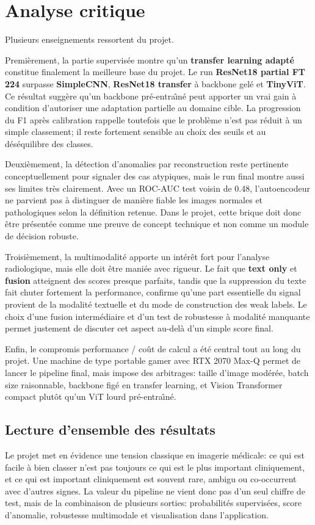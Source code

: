 \documentclass[11pt,a4paper]{article}
\newif\ifsectionbreakenabled
\let\oldsection\section
\renewcommand{\section}[1]{%
    \ifsectionbreakenabled
        \clearpage
    \else
        \sectionbreakenabledtrue
    \fi
    \oldsection{#1}%
}
\begin{document}
\section{Analyse critique}
Plusieurs enseignements ressortent du projet.

Premi\`erement, la partie supervis\'ee montre qu'un \textbf{transfer learning adapt\'e} constitue finalement la meilleure base du projet. Le run \textbf{ResNet18 partial FT 224} surpasse \textbf{SimpleCNN}, \textbf{ResNet18 transfer} \`a backbone gel\'e et \textbf{TinyViT}. Ce r\'esultat sugg\`ere qu'un backbone pr\'e-entra\^\i n\'e peut apporter un vrai gain \`a condition d'autoriser une adaptation partielle au domaine cible. La progression du F1 apr\`es calibration rappelle toutefois que le probl\`eme n'est pas r\'eduit \`a un simple classement; il reste fortement sensible au choix des seuils et au d\'es\'equilibre des classes.

Deuxi\`emement, la d\'etection d'anomalies par reconstruction reste pertinente conceptuellement pour signaler des cas atypiques, mais le run final montre aussi ses limites tr\`es clairement. Avec un ROC-AUC test voisin de 0.48, l'autoencodeur ne parvient pas \`a distinguer de mani\`ere fiable les images normales et pathologiques selon la d\'efinition retenue. Dans le projet, cette brique doit donc \^etre pr\'esent\'ee comme une preuve de concept technique et non comme un module de d\'ecision robuste.

Troisi\`emement, la multimodalit\'e apporte un int\'er\^et fort pour l'analyse radiologique, mais elle doit \^etre mani\'ee avec rigueur. Le fait que \textbf{text only} et \textbf{fusion} atteignent des scores presque parfaits, tandis que la suppression du texte fait chuter fortement la performance, confirme qu'une part essentielle du signal provient de la modalit\'e textuelle et du mode de construction des weak labels. Le choix d'une fusion interm\'ediaire et d'un test de robustesse \`a modalit\'e manquante permet justement de discuter cet aspect au-del\`a d'un simple score final.

Enfin, le compromis performance / co\^ut de calcul a \'et\'e central tout au long du projet. Une machine de type portable gamer avec RTX 2070 Max-Q permet de lancer le pipeline final, mais impose des arbitrages: taille d'image mod\'er\'ee, batch size raisonnable, backbone fig\'e en transfer learning, et Vision Transformer compact plut\^ot qu'un ViT lourd pr\'e-entra\^\i n\'e.

\subsection{Lecture d'ensemble des r\'esultats}
Le projet met en \'evidence une tension classique en imagerie m\'edicale: ce qui est facile \`a bien classer n'est pas toujours ce qui est le plus important cliniquement, et ce qui est important cliniquement est souvent rare, ambigu ou co-occurrent avec d'autres signes. La valeur du pipeline ne vient donc pas d'un seul chiffre de test, mais de la combinaison de plusieurs sorties: probabilit\'es supervis\'ees, score d'anomalie, robustesse multimodale et visualisation dans l'application.
\end{document}
